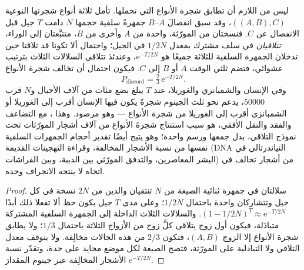 \begin{proposition}\label{prop:b3:molecular-evolution:ils}
ليس من اللازم أن تطابق  شجرة الأنواع التي
تحملها. تأمل ثلاثة أنواع شجرتها النوعية $((A,B),C)$، وقد سبق
انفصالَ $A$--$B$ جمهرةٌ سلفية حجمها $N$ دامت
$T$ جيل قبل الانفصال عن $C$. فنسختان من المورّثة، واحدة من
$A$ وأخرى من $B$، متتبَّعتان إلى الوراء، \emph{تتلاقيان} في
سلف مشترك بمعدل $1/2N$ في الجيل؛ واحتمال ألا تكونا قد
تلاقتا حين تدخلان الجمهرة السلفية للثلاثة جميعًا هو
$\mathrm{e}^{-T/2N}$، وعندئذ تتلاقى السلالات الثلاث بترتيب
عشوائي، فتضم  ثلثي الوقت $A$ أو $B$
إلى $C$. فيكون احتمال أن تخالف  شجرة
الأنواع
\[
P_{\text{discord}} = \tfrac{2}{3}\,\mathrm{e}^{-T/2N} .
\]
وفي الإنسان والشمبانزي والغوريلا، عند $T$ يبلغ بضع مئات من
آلاف الأجيال و$N$ قرب \num{50000}، يدعم نحو ثلث الجينوم
شجرةً يكون فيها الإنسان أقرب إلى الغوريلا أو الشمبانزي أقرب
إلى الغوريلا من شجرة الأنواع --- وهو مرصود. وهذا
\emph{}، مع التضاعف والفقد
والنقل الأفقي، هو سبب استنتاج \emph{} شجرةَ
الأنواع من آلاف أشجار المورّثات تحت نموذج التلاقي،
بدل جمعها ورسم واحدة؛ وهو يتيح أيضًا تقدير أحجام الجمهرات
السلفية نفسها من نسبة الأشجار المخالفة، وقراءة التهجينات
القديمة (DNA النياندرتالي في البشر المعاصرين، والتدفق
المورّثي بين الدببة، وبين الفراشات) من أشجار تخالف في اتجاه
لا ينتجه الانجراف وحده.
\end{proposition}
\begin{proof}
سلالتان في جمهرة ثنائية الصيغة من $N$ تنتقيان والدين من $2N$
نسخة في كل جيل وتتشاركان واحدة باحتمال $1/2N$؛ وعلى مدى $T$
جيل يكون حظ ألا تفعلا ذلك أبدًا $(1 - 1/2N)^{T} \approx
\mathrm{e}^{-T/2N}$. والسلالات الثلاث الداخلة إلى الجمهرة
السلفية المشتركة متبادَلة، فيكون أول زوج يتلاقى كلَّ زوج من
الأزواج الثلاثة باحتمال $1/3$؛ ولا يطابق شجرة الأنواع إلا
الزوج $(A,B)$، فتكون $2/3$ من هذه الحالات مخالِفة. ولا يتوقف
معدل التلاقي ولا التبادلية على المورّثة، فتصح
الصيغة لكل موضع محايد على حدة، وتقدّر نسبة الأشجار المخالِفة
عبر جينوم المقدارَ $\mathrm{e}^{-T/2N}$.
\end{proof}

